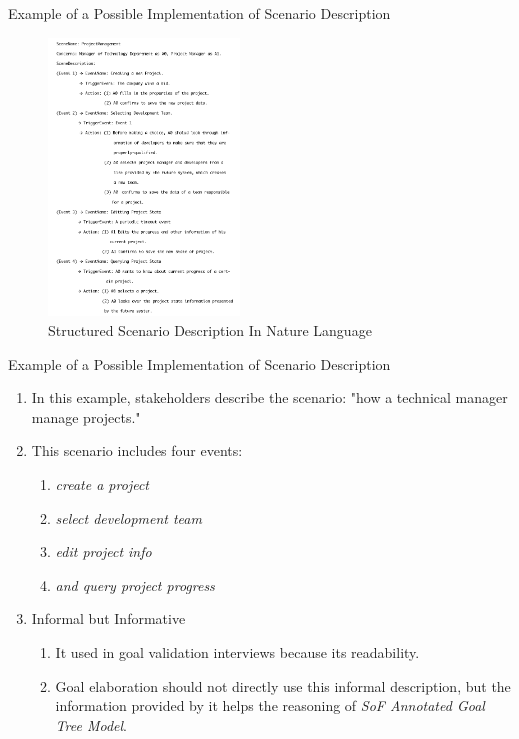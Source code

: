 \documentclass{beamer}
\begin{document}
\begin{frame}{Example of a Possible Implementation of Scenario Description}
  \begin{figure}
    \includegraphics[width=2.0in]{img/3.PNG}
    \caption{Structured Scenario Description In Nature Language}
  \end{figure}
\end{frame}  

\begin{frame}{Example of a Possible Implementation of Scenario Description}
  \begin{enumerate}
  \item
    In this example, stakeholders describe the scenario: "how a technical manager manage projects." \pause
  \item 
    This scenario includes four events: \pause
    \begin{enumerate}
    \item \emph{create a project}
    \item \emph{select development team}
    \item \emph{edit project info}
    \item \emph{and query project progress}
    \end{enumerate}
  \item Informal but Informative \pause
    \begin{enumerate}
    \item It used in goal validation interviews because its readability.\pause 
    \item Goal elaboration should not directly use this informal description, but the information provided by it helps the reasoning of \emph{SoF Annotated Goal Tree Model}.
    \end{enumerate}
  \end{enumerate}
\end{frame}  
\end{document}
